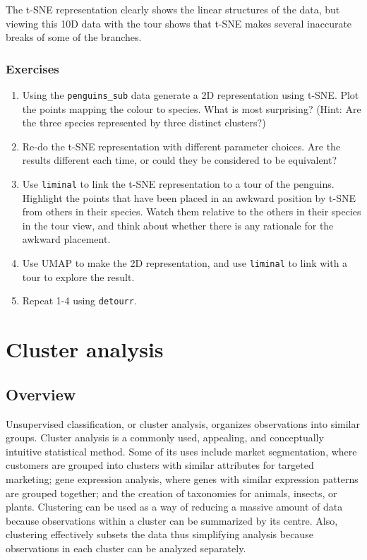 \documentclass[
  letterpaper,
]{krantz}
\providecommand{\tightlist}{%
  \setlength{\itemsep}{0pt}\setlength{\parskip}{0pt}}\usepackage{longtable,booktabs,array}
\begin{document}
The t-SNE representation clearly shows the linear structures of the
data, but viewing this 10D data with the tour shows that t-SNE makes
several inaccurate breaks of some of the branches.

\hypertarget{exercises-4}{%
\section*{Exercises}\label{exercises-4}}


\begin{enumerate}
\def\labelenumi{\arabic{enumi}.}
\tightlist
\item
  Using the \texttt{penguins\_sub} data generate a 2D representation
  using t-SNE. Plot the points mapping the colour to species. What is
  most surprising? (Hint: Are the three species represented by three
  distinct clusters?)
\item
  Re-do the t-SNE representation with different parameter choices. Are
  the results different each time, or could they be considered to be
  equivalent?
\item
  Use \texttt{liminal} to link the t-SNE representation to a tour of the
  penguins. Highlight the points that have been placed in an awkward
  position by t-SNE from others in their species. Watch them relative to
  the others in their species in the tour view, and think about whether
  there is any rationale for the awkward placement.
\item
  Use UMAP to make the 2D representation, and use \texttt{liminal} to
  link with a tour to explore the result.
\item
  Repeat 1-4 using \texttt{detourr}.
\end{enumerate}

\part{Cluster analysis}

\hypertarget{overview}{%
\chapter{Overview}\label{overview}}

Unsupervised classification, or cluster analysis, organizes observations
into similar groups. Cluster analysis is a commonly used, appealing, and
conceptually intuitive statistical method. Some of its uses include
market segmentation, where customers are grouped into clusters with
similar attributes for targeted marketing; gene expression analysis,
where genes with similar expression patterns are grouped together; and
the creation of taxonomies for animals, insects, or plants. Clustering
can be used as a way of reducing a massive amount of data because
observations within a cluster can be summarized by its centre. Also,
clustering effectively subsets the data thus simplifying analysis
because observations in each cluster can be analyzed separately.
\end{document}
